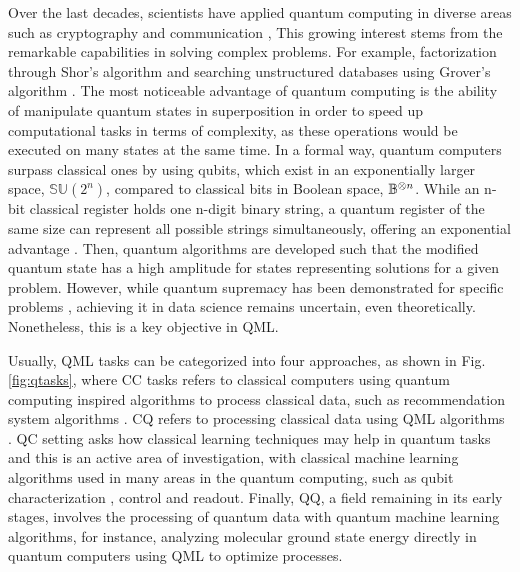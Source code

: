 \documentclass{article}
\begin{document}
Over the last decades, scientists have applied quantum computing in diverse areas such as cryptography \cite{Broadbent2015} and communication \cite{Farouk2018}, This growing interest stems from the remarkable 
capabilities in solving complex problems. For example, factorization through Shor's algorithm \cite{Shor2006} and searching unstructured databases using Grover's algorithm \cite{Grover1996}. The most 
noticeable advantage of quantum computing is the ability of manipulate quantum states in superposition in order to speed up computational tasks in terms of complexity, as these operations would be 
executed on many states at the same time. In a formal way, quantum computers surpass classical ones by using qubits, which exist in an exponentially larger space, $\mathbb{SU}(2^n)$, compared to 
classical bits in Boolean space, $\mathbb{B}^{\tens{} n} $. While an n-bit classical register holds one n-digit binary string, a quantum register of the same size can represent all possible strings 
simultaneously, offering an exponential advantage \cite{Nielsen_Chuang_2010}. Then, quantum algorithms are developed such that the modified quantum state has a high amplitude 
for states representing solutions for a given problem. 
However, while quantum supremacy has been demonstrated for specific problems \cite{Arute2019}, achieving it in data science remains uncertain, even theoretically. 
Nonetheless, this is a key objective in QML.

Usually, QML tasks can be categorized into four approaches, as shown in Fig. \ref{fig:qtasks}, where CC tasks refers to classical computers using quantum computing inspired 
algorithms to process classical data, such as recommendation system algorithms \cite{ccalg}. CQ refers to processing classical data using QML algorithms \cite{cq}. 
QC setting asks how classical learning techniques may help in quantum tasks and this is an active area of investigation, with classical machine learning 
algorithms used in many areas in the quantum computing, such as qubit characterization \cite{charqc}, control \cite{controlqc} and readout\cite{readoutqc}. 
Finally, QQ, a field remaining in its early stages, involves the processing of quantum data with quantum machine learning algorithms, 
for instance, analyzing molecular ground state energy directly in quantum computers using QML to optimize processes.
\end{document}
